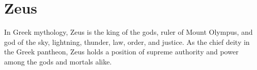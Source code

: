 \section{Zeus}\label{zeus}

In Greek mythology, Zeus is the king of the gods, ruler of Mount Olympus, and god of the sky, lightning, thunder, law, order, and justice. As the chief deity in the Greek pantheon, Zeus holds a position of supreme authority and power among the gods and mortals alike.
